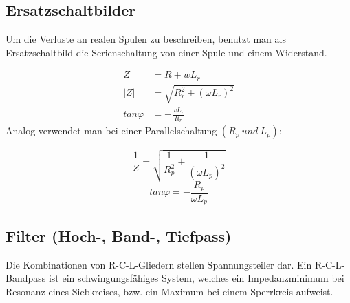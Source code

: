 \subsection{Ersatzschaltbilder}
Um die Verluste an realen Spulen zu beschreiben, benutzt man als Ersatzschaltbild die Serienschaltung von einer Spule und einem Widerstand.
\begin{center}
\begin{minipage}{\linewidth}
\centering
{}
\end{minipage}
\end{center}
\begin{align}
Z&= R+wL_r\\
|Z|&=\sqrt{R_{r}^2+(\omega L_{r})^2}\\
tan \varphi &=-\frac{\omega L_{r}}{R_{r}}
\end{align}
Analog verwendet man bei einer Parallelschaltung \((R_{p}\ und\ L_{p}) \):
\begin{center}
\begin{minipage}{\linewidth}
\centering
{}
\end{minipage}
\end{center}
\begin{equation}
\frac{1}{Z}=\sqrt{\frac{1}{R_{p}^2}+\frac{1}{(\omega L_{p})^2}}
\end{equation}
\begin{equation}
tan\varphi =-\frac{R_{p}}{\omega L_{p}}
\end{equation}
\subsection{Filter (Hoch-, Band-, Tiefpass)}
Die Kombinationen von R-C-L-Gliedern stellen Spannungsteiler dar.
Ein R-C-L-Bandpass ist ein schwingungsfähiges System, welches ein Impedanzminimum bei Resonanz eines Siebkreises, bzw. ein Maximum bei einem Sperrkreis aufweist.

